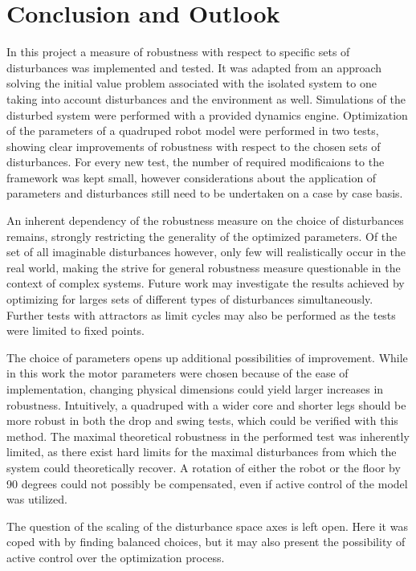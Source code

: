 \chapter{Conclusion and Outlook}


In this project a measure of robustness with respect to specific sets of disturbances was implemented and tested. It was adapted from an approach solving the initial value problem associated with the isolated system to one taking into account disturbances and the environment as well. Simulations of the disturbed system were performed with a provided dynamics engine. Optimization of the parameters of a quadruped robot model were performed in two tests, showing clear improvements of robustness with respect to the chosen sets of disturbances. 
For every new test, the number of required modificaions to the framework was kept small, however considerations about the application of parameters and disturbances still need to be undertaken on a case by case basis. 

An inherent dependency of the robustness measure on the choice of disturbances remains, strongly restricting the generality of the optimized parameters. Of the set of all imaginable disturbances however, only few will realistically occur in the real world, making the strive for general robustness measure questionable in the context of complex systems. Future work may investigate the results achieved by optimizing for larges sets of different types of disturbances simultaneously. Further tests with attractors as limit cycles may also be performed as the tests were limited to fixed points. 

The choice of parameters opens up additional possibilities of improvement. While in this work the motor parameters were chosen because of the ease of implementation, changing physical dimensions could yield larger increases in robustness. Intuitively, a quadruped with a wider core and shorter legs should be more robust in both the drop and swing tests, which could be verified with this method. The maximal theoretical robustness in the performed test was inherently limited, as there exist hard limits for the maximal disturbances from which the system could theoretically recover. A rotation of either the robot or the floor by 90 degrees could not possibly be compensated, even if active control of the model was utilized. 

The question of the scaling of the disturbance space axes is left open. Here it was coped with by finding balanced choices, but it may also present the possibility of active control over the optimization process.  


